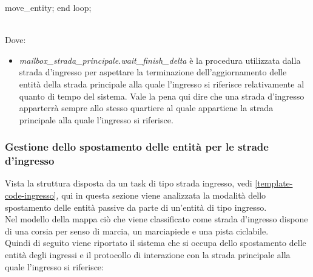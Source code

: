 \begin{itemize}
\begin{codiceada}[caption={Template-Code strade ingresso}, label=template-code-ingresso]
	move_entity;
end loop;
\end{codiceada}
\\
Dove:
\begin{itemize}
\item \textit{mailbox\_strada\_principale.wait\_finish\_delta}  
è la procedura utilizzata dalla strada d'ingresso per aspettare la terminazione
dell'aggiornamento delle entità della strada principale alla quale l'ingresso
si riferisce relativamente al quanto di tempo del sistema. Vale la pena qui
dire che una strada d'ingresso apparterrà sempre allo stesso quartiere al quale
appartiene la strada principale alla quale l'ingresso si riferisce.
\end{itemize}
\end{itemize}

\subsubsection{Gestione dello spostamento delle entità per le strade d'ingresso}
Vista la struttura disposta da un task di tipo strada ingresso, vedi
\ref{template-code-ingresso}, qui in questa sezione viene analizzata la
modalità dello spostamento delle entità passive da parte di un'entità di tipo
ingresso.\\
Nel modello della mappa ciò che viene classificato come strada d'ingresso
dispone di una corsia per senso di marcia, un marciapiede e una pista ciclabile.\\
Quindi di seguito viene riportato il sistema che si occupa dello spostamento
 delle entità degli ingressi e il protocollo di interazione con la strada
principale alla quale l'ingresso si riferisce:
